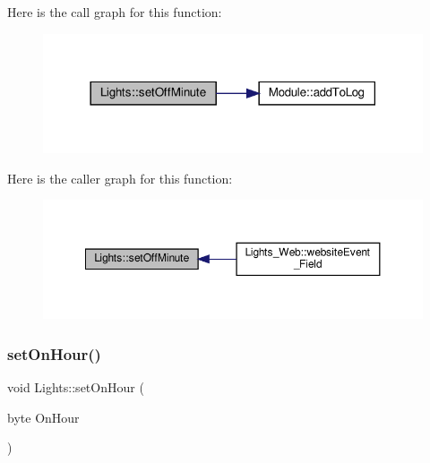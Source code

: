 Here is the call graph for this function\+:
\nopagebreak
\begin{figure}[H]
\begin{center}
\leavevmode
\includegraphics[width=318pt]{class_lights_a922d225ef5a95478c3a8396f49685c77_cgraph}
\end{center}
\end{figure}
Here is the caller graph for this function\+:
\nopagebreak
\begin{figure}[H]
\begin{center}
\leavevmode
\includegraphics[width=350pt]{class_lights_a922d225ef5a95478c3a8396f49685c77_icgraph}
\end{center}
\end{figure}
\mbox{\label{class_lights_ad95bf16e17afbf909d480e995a3c214f}} 
\subsubsection{\texorpdfstring{set\+On\+Hour()}{setOnHour()}\hspace{0.1cm}{\footnotesize\ttfamily [1/2]}}
{\footnotesize\ttfamily void Lights\+::set\+On\+Hour (\begin{DoxyParamCaption}\item[{byte}]{On\+Hour }\end{DoxyParamCaption})\hspace{0.3cm}{\ttfamily [protected]}}

\mbox{\label{class_lights_ad95bf16e17afbf909d480e995a3c214f}} 
